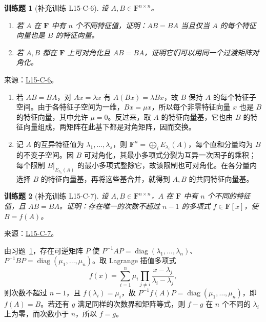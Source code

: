 \documentclass[12pt,fontset=fandol]{ctexart}
\newtheorem{exercise}{训练题}[section]
\begin{document}
\begin{exercise}[补充训练 L15-C-6]\label{prob:L15-C-6}
设 $A,B\in\mathbf F^{n\times n}$。
\begin{enumerate}
\item 若 $A$ 在 $\mathbf F$ 中有 $n$ 个不同特征值，证明：$AB=BA$ 当且仅当 $A$ 的每个特征向量也是 $B$ 的特征向量。
\item 若 $A,B$ 都在 $\mathbf F$ 上可对角化且 $AB=BA$，证明它们可以用同一个过渡矩阵对角化。
\end{enumerate}
\end{exercise}
\noindent 来源：\href{https://github.com/yhwu-is/Linear-Algebra-Left-Undone/blob/new/%E8%AE%B2%E4%B9%89/%E4%B8%93%E9%A2%98/15%20%E7%9B%B8%E4%BC%BC%E6%A0%87%E5%87%86%E5%BD%A2%EF%BC%9A%E5%A4%8D%E6%95%B0%E5%9F%9F%E4%B8%8A%E7%9A%84%E5%B0%9D%E8%AF%95%E4%B8%8E%E7%90%86%E8%AE%BA.tex}{L15-C-6}。
\begin{solve}
\begin{enumerate}
\item 若 $AB=BA$，对 $Ax=\lambda x$ 有 $A(Bx)=\lambda Bx$，故 $B$ 保持 $A$ 的每个特征子空间。由于各特征子空间为一维，$Bx=\mu x$，所以每个非零特征向量 $x$ 也是 $B$ 的特征向量，其中允许 $\mu=0$。反过来，取 $A$ 的特征向量基，它也由 $B$ 的特征向量组成，两矩阵在此基下都是对角矩阵，因而交换。
\item 记 $A$ 的互异特征值为 $\lambda_1,\ldots,\lambda_s$，则 $\mathbf F^n=\bigoplus_i E_{\lambda_i}(A)$，每个直和分量均为 $B$ 的不变子空间。因 $B$ 可对角化，其最小多项式分裂为互异一次因子的乘积；每个限制 $B|_{E_{\lambda_i}(A)}$ 的最小多项式整除它，故该限制也可对角化。在各分量内选择 $B$ 的特征向量基，再将这些基合并，就得到 $A,B$ 的共同特征向量基。
\end{enumerate}
\end{solve}

\begin{exercise}[补充训练 L15-C-7]\label{prob:L15-C-7}
设 $A,B\in\mathbf F^{n\times n}$，$A$ 在 $\mathbf F$ 中有 $n$ 个不同的特征值，且 $AB=BA$。证明：存在唯一的次数不超过 $n-1$ 的多项式 $f\in\mathbf F[x]$，使 $B=f(A)$。
\end{exercise}
\noindent 来源：\href{https://github.com/yhwu-is/Linear-Algebra-Left-Undone/blob/new/%E8%AE%B2%E4%B9%89/%E4%B8%93%E9%A2%98/15%20%E7%9B%B8%E4%BC%BC%E6%A0%87%E5%87%86%E5%BD%A2%EF%BC%9A%E5%A4%8D%E6%95%B0%E5%9F%9F%E4%B8%8A%E7%9A%84%E5%B0%9D%E8%AF%95%E4%B8%8E%E7%90%86%E8%AE%BA.tex}{L15-C-7}。
\begin{solve}
由习题~\ref{prob:L15-C-6}，存在可逆矩阵 $P$ 使 $P^{-1}AP=\operatorname{diag}(\lambda_1,\ldots,\lambda_n)$、$P^{-1}BP=\operatorname{diag}(\mu_1,\ldots,\mu_n)$。取 Lagrange 插值多项式
\[f(x)=\sum_{i=1}^n\mu_i\prod_{j\ne i}\frac{x-\lambda_j}{\lambda_i-\lambda_j},\]
则次数不超过 $n-1$，且 $f(\lambda_i)=\mu_i$，故 $P^{-1}f(A)P=\operatorname{diag}(\mu_1,\ldots,\mu_n)$，即 $f(A)=B$。若还有 $g$ 满足同样的次数界和矩阵等式，则 $f-g$ 在 $n$ 个不同的 $\lambda_i$ 上为零，而次数小于 $n$，所以 $f=g$。
\end{solve}
\end{document}
